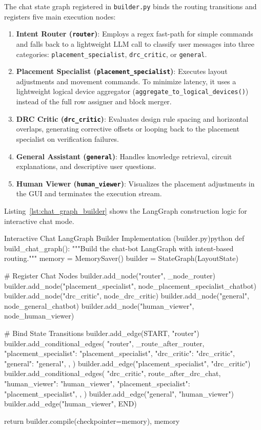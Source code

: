 The chat state graph registered in \texttt{builder.py} binds the routing transitions and registers five main execution nodes:
\begin{enumerate}
    \item \textbf{Intent Router (\texttt{router})}: Employs a regex fast-path for simple commands and falls back to a lightweight LLM call to classify user messages into three categories: \texttt{placement\_specialist}, \texttt{drc\_critic}, or \texttt{general}.
    \item \textbf{Placement Specialist (\texttt{placement\_specialist})}: Executes layout adjustments and movement commands. To minimize latency, it uses a lightweight logical device aggregator (\texttt{aggregate\_}\allowbreak\texttt{to\_}\allowbreak\texttt{logical\_}\allowbreak\texttt{devices()}) instead of the full row assigner and block merger.
    \item \textbf{DRC Critic (\texttt{drc\_critic})}: Evaluates design rule spacing and horizontal overlaps, generating corrective offsets or looping back to the placement specialist on verification failures.
    \item \textbf{General Assistant (\texttt{general})}: Handles knowledge retrieval, circuit explanations, and descriptive user questions.
    \item \textbf{Human Viewer (\texttt{human\_viewer})}: Visualizes the placement adjustments in the GUI and terminates the execution stream.
\end{enumerate}

Listing~\ref{lst:chat_graph_builder} shows the LangGraph construction logic for interactive chat mode.

\begin{thesiscode}{Interactive Chat LangGraph Builder Implementation (builder.py)\label{lst:chat_graph_builder}}{python}
def build_chat_graph():
    """Build the chat-bot LangGraph with intent-based routing."""
    memory = MemorySaver()
    builder = StateGraph(LayoutState)

    # Register Chat Nodes
    builder.add_node("router", _node_router)
    builder.add_node("placement_specialist", node_placement_specialist_chatbot)
    builder.add_node("drc_critic", node_drc_critic)
    builder.add_node("general", node_general_chatbot)
    builder.add_node("human_viewer", node_human_viewer)

    # Bind State Transitions
    builder.add_edge(START, "router")
    builder.add_conditional_edges(
        "router",
        _route_after_router,
        {
            "placement_specialist": "placement_specialist",
            "drc_critic": "drc_critic",
            "general": "general",
        },
    )
    builder.add_edge("placement_specialist", "drc_critic")
    builder.add_conditional_edges(
        "drc_critic",
        route_after_drc_chat,
        {
            "human_viewer": "human_viewer",
            "placement_specialist": "placement_specialist",
        },
    )
    builder.add_edge("general", "human_viewer")
    builder.add_edge("human_viewer", END)

    return builder.compile(checkpointer=memory), memory
\end{thesiscode}

